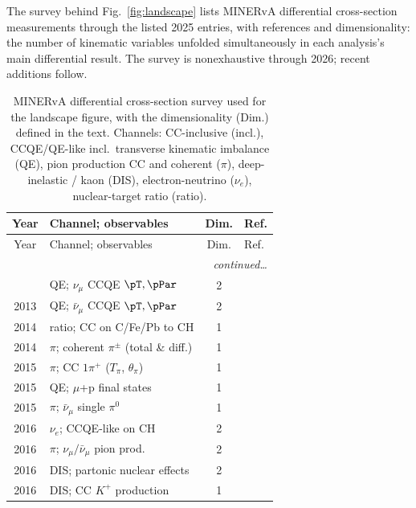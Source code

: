The survey behind Fig.~\ref{fig:landscape} lists MINERvA differential cross-section measurements through the listed 2025 entries, with references and dimensionality: the number of kinematic variables unfolded simultaneously in each analysis's main differential result. The survey is nonexhaustive through 2026; recent additions follow.

{\small
\begin{longtable}{@{}clcl@{}}
  \caption{MINERvA differential cross-section survey used for the landscape figure, with the dimensionality
  (Dim.) defined in the text. Channels: CC-inclusive (incl.),
  CCQE/QE-like incl.\ transverse kinematic imbalance (QE), pion production CC
  and coherent ($\pi$), deep-inelastic / kaon (DIS), electron-neutrino
  ($\nu_e$), nuclear-target ratio (ratio).}
  \label{tab:landscape}\\
  \toprule
  Year & Channel; observables & Dim. & Ref. \\
  \midrule
  \endfirsthead
  \toprule
  Year & Channel; observables & Dim. & Ref. \\
  \midrule
  \endhead
  \midrule \multicolumn{4}{r}{\emph{continued\ldots}}\\ \endfoot
  \bottomrule
  \endlastfoot
  2013 & QE; $\nu_\mu$ CCQE $\pT,\pPar$            & 2 & \cite{MINERvA:2013qe} \\
  2013 & QE; $\bar\nu_\mu$ CCQE $\pT,\pPar$        & 2 & \cite{MINERvA:2013qebar} \\
  2014 & ratio; CC on C/Fe/Pb to CH               & 1 & \cite{MINERvA:2014ratio} \\
  2014 & $\pi$; coherent $\pi^\pm$ (total \& diff.) & 1 & \cite{MINERvA:2014coh} \\
  2015 & $\pi$; CC $1\pi^+$ ($T_\pi$, $\theta_\pi$) & 1 & \cite{MINERvA:2015ydy} \\
  2015 & QE; $\mu$+p final states                 & 1 & \cite{MINERvA:2015mup} \\
  2015 & $\pi$; $\bar\nu_\mu$ single $\pi^0$       & 1 & \cite{MINERvA:2015pi0} \\
  2016 & $\nu_e$; CCQE-like on CH                  & 2 & \cite{MINERvA:2016nueqe} \\
  2016 & $\pi$; $\nu_\mu/\bar\nu_\mu$ pion prod.   & 2 & \cite{MINERvA:2016pion} \\
  2016 & DIS; partonic nuclear effects            & 2 & \cite{MINERvA:2016dis} \\
  2016 & DIS; CC $K^+$ production                  & 1 & \cite{MINERvA:2016kaon} \\

\end{longtable}}
